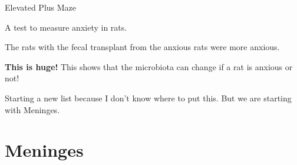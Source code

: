 \begin{coloredlist}
\begin{coloredlist}
\begin{coloredlist}
            \item Elevated Plus Maze
            \begin{coloredlist}
                \item A test to measure anxiety in rats.
                \item The rats with the fecal transplant from the anxious rats were more anxious. 
                \item \textbf{This is huge!} This shows that the microbiota can change if a rat is anxious or not!
            \end{coloredlist}
        \end{coloredlist}
    \end{coloredlist}
\end{coloredlist}

Starting a new list because I don't know where to put this. But we are starting with Meninges.

\section{Meninges}

